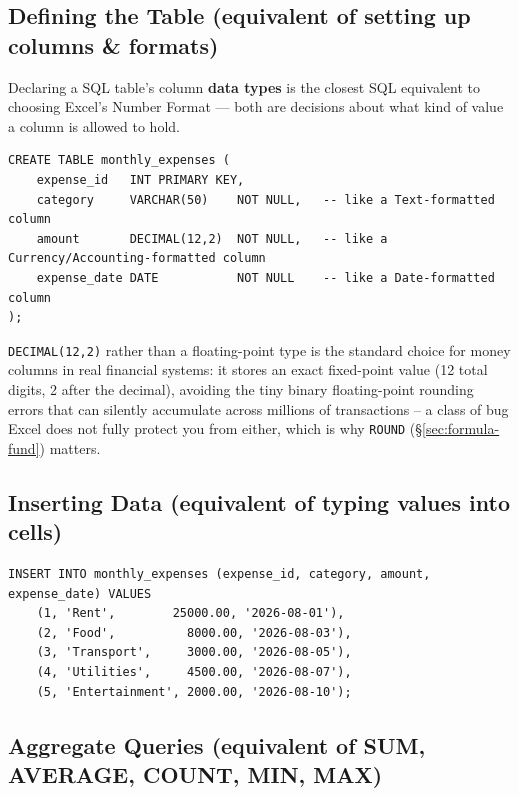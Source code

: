\documentclass[11pt,a4paper]{article}
\begin{document}
\subsection{Defining the Table (equivalent of setting up columns \& formats)}

Declaring a SQL table's column \textbf{data types} is the closest SQL equivalent to choosing Excel's Number Format --- both are decisions about what kind of value a column is allowed to hold.

\begin{lstlisting}[style=sqlstyle, caption={CREATE TABLE, equivalent to typing headers and setting column formats}]
CREATE TABLE monthly_expenses (
    expense_id   INT PRIMARY KEY,
    category     VARCHAR(50)    NOT NULL,   -- like a Text-formatted column
    amount       DECIMAL(12,2)  NOT NULL,   -- like a Currency/Accounting-formatted column
    expense_date DATE           NOT NULL    -- like a Date-formatted column
);
\end{lstlisting}

\begin{financeapp}
\texttt{DECIMAL(12,2)} rather than a floating-point type is the standard choice for money columns in real financial systems: it stores an exact fixed-point value (12 total digits, 2 after the decimal), avoiding the tiny binary floating-point rounding errors that can silently accumulate across millions of transactions -- a class of bug Excel does not fully protect you from either, which is why \texttt{ROUND} (\S\ref{sec:formula-fund}) matters.
\end{financeapp}

\subsection{Inserting Data (equivalent of typing values into cells)}

\begin{lstlisting}[style=sqlstyle, caption={INSERT, equivalent to typing rows of data into a worksheet}]
INSERT INTO monthly_expenses (expense_id, category, amount, expense_date) VALUES
    (1, 'Rent',        25000.00, '2026-08-01'),
    (2, 'Food',          8000.00, '2026-08-03'),
    (3, 'Transport',     3000.00, '2026-08-05'),
    (4, 'Utilities',     4500.00, '2026-08-07'),
    (5, 'Entertainment', 2000.00, '2026-08-10');
\end{lstlisting}

\subsection{Aggregate Queries (equivalent of SUM, AVERAGE, COUNT, MIN, MAX)}
\end{document}
